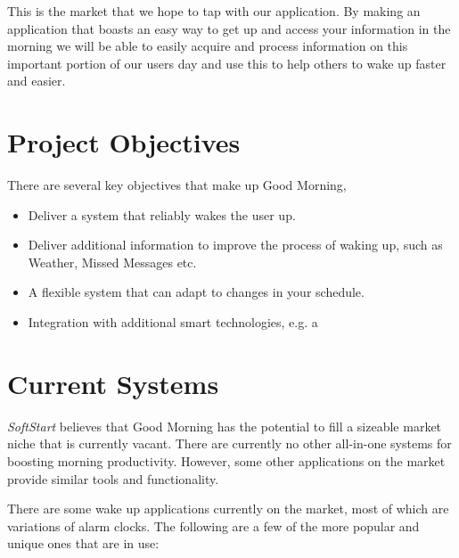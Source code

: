 \documentclass[11pt]{article}
\begin{document}
This is the market that we hope to tap with our application. By making an application that boasts an easy way to get up and access your information in the morning we will be able to easily acquire and process information on this important portion of our users day and use this to help others to wake up faster and easier.

%
\section{Project Objectives}\label{project-objectives}

There are several key objectives that make up Good Morning,

\begin{itemize}
\item
  Deliver a system that reliably wakes the user up.
\item
  Deliver additional information to improve the process of waking up, such as Weather, Missed Messages etc.
\item
  A flexible system that can adapt to changes in your schedule.
\item
  Integration with additional smart technologies, e.g. a 
\end{itemize}


%
\section{Current Systems}\label{current-systems}

\textit{SoftStart} believes that Good Morning has the potential to fill a sizeable market niche that is currently vacant. There are currently no other all-in-one systems for boosting morning productivity. However, some other applications on the market provide similar tools and functionality.

There are some wake up applications currently on the market, most of which are variations of alarm clocks. The following are a few of the more popular and unique ones that are in use:
\end{document}
